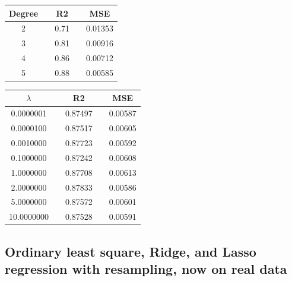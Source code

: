  \begin{center}
 \label{tab:Lasso_Degree_R2_MSE}
 \begin{tabularx}{\textwidth}{c X c X c  }
     \hline
     \hline
         Degree && R2 && MSE \\
         \hline
2      && 0.71 && 0.01353 \\ 
3      && 0.81 && 0.00916 \\ 
4      && 0.86 && 0.00712 \\ 
5      && 0.88 && 0.00585 \\ \hline
 \end{tabularx}
 \end{center}
 
 
 \begin{center}
 \label{tab:Degree_R2_MSE}
 \begin{tabularx}{\textwidth}{c X c X c  }
     \hline
     \hline
$\lambda$    &&R2     &&MSE     \\
         \hline
0.0000001 &&0.87497&&0.00587 \\
0.0000100 &&0.87517&&0.00605 \\
0.0010000 &&0.87723&&0.00592 \\
0.1000000 &&0.87242&&0.00608 \\
1.0000000 &&0.87708&&0.00613 \\
2.0000000 &&0.87833&&0.00586 \\
5.0000000 &&0.87572&&0.00601 \\
10.0000000 && 0.87528&&0.00591
 \end{tabularx}
 \end{center}
 
\subsection{Ordinary least square, Ridge, and Lasso regression with resampling, now on real data}

